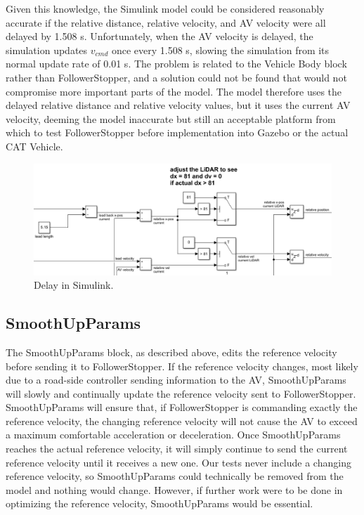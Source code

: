 \documentclass[conference]{IEEEtran}
\begin{document}
Given this knowledge, the Simulink model could be considered reasonably accurate if the relative distance, relative velocity, and AV velocity were all delayed by 1.508 s. Unfortunately, when the AV velocity is delayed, the simulation updates $v_{cmd}$ once every 1.508 s, slowing the simulation from its normal update rate of 0.01 s. The problem is related to the Vehicle Body block rather than FollowerStopper, and a solution could not be found that would not compromise more important parts of the model. The model therefore uses the delayed relative distance and relative velocity values, but it uses the current AV velocity, deeming the model inaccurate but still an acceptable platform from which to test FollowerStopper before implementation into Gazebo or the actual CAT Vehicle.

\begin{figure}[htbp]
\centerline{\includegraphics[width=3.5 in]{delay.png}}
\caption{Delay in Simulink.}
\label{fig2}
\end{figure}

\subsection{SmoothUpParams}
The SmoothUpParams block, as described above, edits the reference velocity before sending it to FollowerStopper. If the reference velocity changes, most likely due to a road-side controller sending information to the AV, SmoothUpParams will slowly and continually update the reference velocity sent to FollowerStopper. SmoothUpParams will ensure that, if FollowerStopper is commanding exactly the reference velocity, the changing reference velocity will not cause the AV to exceed a maximum comfortable acceleration or deceleration. Once SmoothUpParams reaches the actual reference velocity, it will simply continue to send the current reference velocity until it receives a new one. Our tests never include a changing reference velocity, so SmoothUpParams could technically be removed from the model and nothing would change. However, if further work were to be done in optimizing the reference velocity, SmoothUpParams would be essential.
\end{document}
